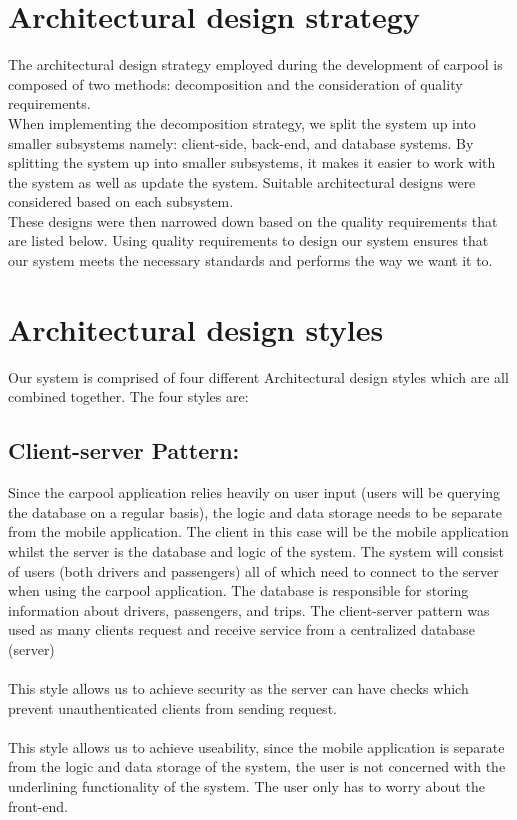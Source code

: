 \documentclass[hidelinks, 12pt, a4paper]{article}
\begin{document}
\section{Architectural design strategy}
The architectural design strategy employed during the development of carpool  is  composed of two methods: decomposition and the consideration of quality requirements.
\newline \\
When implementing the decomposition strategy, we split the system up into smaller subsystems namely: client-side, back-end, and database systems. By splitting the system up into smaller subsystems, it makes it easier to work with the system as well as update the system. Suitable architectural designs were considered based on each subsystem.
\newline \\
These designs were then narrowed down based on the quality requirements that are listed below. Using quality requirements to design our system ensures that our system meets the necessary standards and performs the way we want it to.
\vspace{0.75cm}
\section{Architectural design styles}
Our system is comprised of four different Architectural design styles which are all combined together. The four styles are:

\subsection{\textbf{Client-server Pattern:}}
\newline
Since the carpool application relies heavily on user input (users will be querying the database on a regular basis), the logic and data storage needs to be separate from the mobile application. The client in this case will be the mobile application whilst the server is the database and logic of the system. The system will consist of users (both drivers and passengers) all of which need to connect to the server when using the carpool application. The database is responsible for storing information about drivers, passengers, and trips.
The client-server pattern was used as many clients request and receive service from a centralized database (server) \\ \\
This style allows us to achieve security as the server can have checks which prevent unauthenticated clients from sending request.\\ \\
This style allows us to achieve useability, since the mobile application is separate from the logic and data storage of the system, the user is not concerned with the underlining functionality of the system. The user only has to worry about the front-end.
\end{document}
